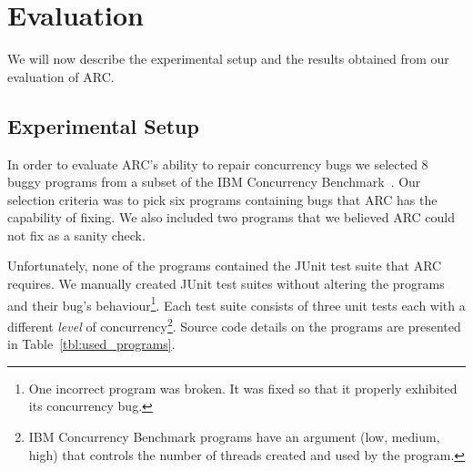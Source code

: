 \section{Evaluation}
\label{sec:experiments}

We will now describe the experimental setup and the results obtained from our evaluation of ARC.


\subsection{Experimental Setup}
\label{sec:experimental_setup}

In order to evaluate ARC's ability to repair concurrency bugs we selected 8 buggy programs from a subset of the IBM Concurrency Benchmark~\cite{EHSU06}. Our selection criteria was to pick six programs containing bugs that ARC has the capability of fixing. We also included two programs that we believed ARC could not fix as a sanity check.

Unfortunately, none of the programs contained the JUnit test suite that ARC requires. We manually created JUnit test suites without altering the programs and their bug's behaviour\footnote{One incorrect program was broken.  It was fixed so that it properly exhibited its concurrency bug.}. Each test suite consists of three unit tests each with a different \textit{level} of concurrency\footnote{IBM Concurrency Benchmark programs have an argument (low, medium, high) that controls the number of threads created and used by the program.}. Source code details on the programs are presented in Table~\ref{tbl:used_programs}.

